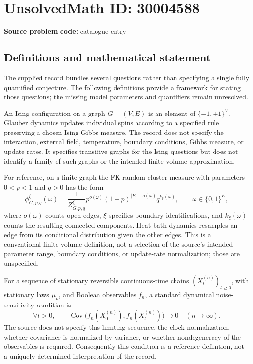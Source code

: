\documentclass[11pt]{article}
\begin{document}
\section*{UnsolvedMath ID: 30004588}
\textbf{Source problem code:} catalogue entry
\subsection{Definitions and mathematical statement}
The supplied record bundles several questions rather than specifying a single fully quantified conjecture. The following definitions provide a framework for stating those questions; the missing model parameters and quantifiers remain unresolved.

An Ising configuration on a graph \(G=(V,E)\) is an element of \(\{-1,+1\}^{V}\). Glauber dynamics updates individual spins according to a specified rule preserving a chosen Ising Gibbs measure. The record does not specify the interaction, external field, temperature, boundary conditions, Gibbs measure, or update rates. It specifies transitive graphs for the Ising questions but does not identify a family of such graphs or the intended finite-volume approximation.

For reference, on a finite graph the FK random-cluster measure with parameters \(0<p<1\) and \(q>0\) has the form
\[
 \phi_{G,p,q}^{\xi}(\omega)
 =\frac{1}{Z_{G,p,q}^{\xi}}
 p^{o(\omega)}(1-p)^{|E|-o(\omega)}q^{k_{\xi}(\omega)},
 \qquad \omega\in\{0,1\}^{E},
\]
where \(o(\omega)\) counts open edges, \(\xi\) specifies boundary identifications, and \(k_{\xi}(\omega)\) counts the resulting connected components. Heat-bath dynamics resamples an edge from its conditional distribution given the other edges. This is a conventional finite-volume definition, not a selection of the source's intended parameter range, boundary conditions, or update-rate normalization; those are unspecified.

For a sequence of stationary reversible continuous-time chains \((X_t^{(n)})_{t\geq0}\), with stationary laws \(\mu_n\), and Boolean observables \(f_n\), a standard dynamical noise-sensitivity condition is
\[
 \forall t>0,\qquad
 \operatorname{Cov}\bigl(f_n(X_0^{(n)}),f_n(X_t^{(n)})\bigr)
 \longrightarrow 0\quad(n\to\infty).
\]
The source does not specify this limiting sequence, the clock normalization, whether covariance is normalized by variance, or whether nondegeneracy of the observables is required. Consequently this condition is a reference definition, not a uniquely determined interpretation of the record.
\end{document}
